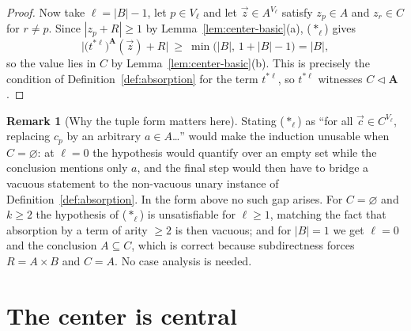 \documentclass[11pt]{article}
\theoremstyle{mainplain}
\theoremstyle{mainroman}
\theoremstyle{definition}
\newtheorem{remark}[theorem]{Remark}
\numberwithin{equation}{section}
\newcommand{\bA}{\mathbf A}
\newcommand{\ab}{\lhd}
\begin{document}
\begin{proof}
Now take $\ell=|B|-1$, let $p\in V_{\ell}$ and let $\vec z\in A^{V_{\ell}}$
satisfy $z_p\in A$ and $z_r\in C$ for $r\ne p$. Since $|z_p+R|\ge1$ by
Lemma~\ref{lem:center-basic}(a), ($\ast_\ell$) gives
\[
 \bigl|\bigl(t^{*\ell}\bigr)^{\bA}(\vec z)+R\bigr|
 \ \ge\ \min\bigl(|B|,\,1+|B|-1\bigr)=|B|,
\]
so the value lies in $C$ by Lemma~\ref{lem:center-basic}(b). This is precisely
the condition of Definition~\ref{def:absorption} for the term $t^{*\ell}$, so
$t^{*\ell}$ witnesses $C\ab\bA$.
\end{proof}

\begin{remark}[Why the tuple form matters here]\label{rem:induction-shape}
Stating ($\ast_\ell$) as ``for all $\vec c\in C^{V_{\ell}}$, replacing
$c_p$ by an arbitrary $a\in A$\dots'' would make the induction unusable when
$C=\varnothing$: at $\ell=0$ the hypothesis would quantify over an empty set
while the conclusion mentions only $a$, and the final step would then have to
bridge a vacuous statement to the non-vacuous unary instance of
Definition~\ref{def:absorption}. In the form above no such gap arises. For
$C=\varnothing$ and $k\ge2$ the hypothesis of ($\ast_{\ell}$) is unsatisfiable
for $\ell\ge1$, matching the fact that absorption by a term of arity $\ge2$ is
then vacuous; and for $|B|=1$ we get $\ell=0$ and the conclusion
$A\subseteq C$, which is correct because subdirectness forces $R=A\times B$ and
$C=A$. No case analysis is needed.
\end{remark}

\section{The center is central}\label{sec:central}
\end{document}
